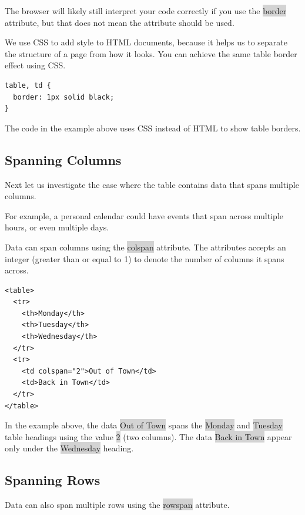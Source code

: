 \documentclass[11pt]{article}
\begin{document}
The browser will likely still interpret your code correctly if you use the \colorbox{lightgray}{border} attribute, but that does not mean the attribute should be used.

We use CSS to add style to HTML documents, because it helps us to separate the structure of a page from how it looks. You can achieve the same table border effect using CSS.
\begin{lstlisting}
table, td {
  border: 1px solid black;
}
\end{lstlisting}
The code in the example above uses CSS instead of HTML to show table borders.

\subsection{Spanning Columns}
Next let us investigate the case where the table contains data that spans multiple columns. 

For example, a personal calendar could have events that span across multiple hours, or even multiple days.

Data can span columns using the \colorbox{lightgray}{colspan} attribute. The attributes accepts an integer (greater than or equal to 1) to denote the number of columns it spans across.
\begin{lstlisting}
<table>
  <tr>
    <th>Monday</th>
    <th>Tuesday</th>
    <th>Wednesday</th>
  </tr>
  <tr>
    <td colspan="2">Out of Town</td>
    <td>Back in Town</td>
  </tr>
</table>
\end{lstlisting}
In the example above, the data \colorbox{lightgray}{Out of Town} spans the \colorbox{lightgray}{Monday} and \colorbox{lightgray}{Tuesday} table headings using the value \colorbox{lightgray}{2} (two columns). The data \colorbox{lightgray}{Back in Town} appear only under the \colorbox{lightgray}{Wednesday} heading.

\subsection{Spanning Rows}
Data can also span multiple rows using the \colorbox{lightgray}{rowspan} attribute.
\end{document}
